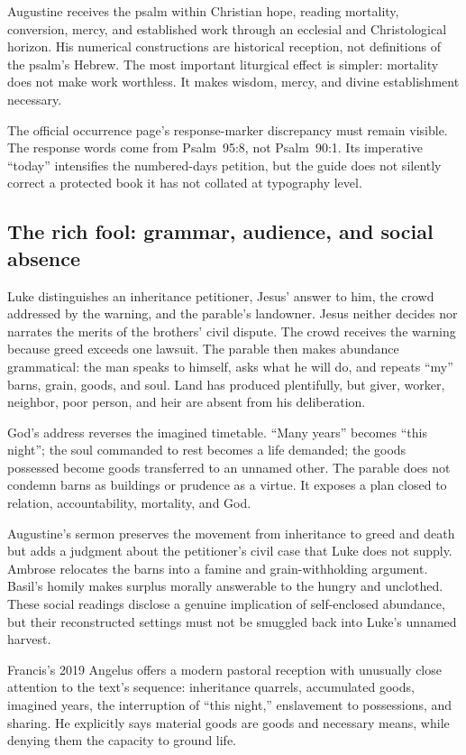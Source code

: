 Augustine receives the psalm within Christian hope, reading mortality,
conversion, mercy, and established work through an ecclesial and
Christological horizon. His numerical constructions are historical reception,
not definitions of the psalm's Hebrew. The most important liturgical effect is
simpler: mortality does not make work worthless. It makes wisdom, mercy, and
divine establishment necessary.

The official occurrence page's response-marker discrepancy must remain
visible. The response words come from Psalm~95:8, not Psalm~90:1. Its
imperative “today” intensifies the numbered-days petition, but the guide does
not silently correct a protected book it has not collated at typography level.

\subsection*{The rich fool: grammar, audience, and social absence}

Luke distinguishes an inheritance petitioner, Jesus' answer to him, the crowd
addressed by the warning, and the parable's landowner. Jesus neither decides
nor narrates the merits of the brothers' civil dispute. The crowd receives the
warning because greed exceeds one lawsuit. The parable then makes abundance
grammatical: the man speaks to himself, asks what he will do, and repeats
``my'' barns, grain, goods, and soul. Land has produced plentifully, but giver,
worker, neighbor, poor person, and heir are absent from his deliberation.

God's address reverses the imagined timetable. “Many years” becomes “this
night”; the soul commanded to rest becomes a life demanded; the goods
possessed become goods transferred to an unnamed other. The parable does not
condemn barns as buildings or prudence as a virtue. It exposes a plan closed
to relation, accountability, mortality, and God.

Augustine's sermon preserves the movement from inheritance to greed and death
but adds a judgment about the petitioner's civil case that Luke does not
supply. Ambrose relocates the barns into a famine and grain-withholding
argument. Basil's homily makes surplus morally answerable to the hungry and
unclothed. These social readings disclose a genuine implication of
self-enclosed abundance, but their reconstructed settings must not be smuggled
back into Luke's unnamed harvest.

Francis's 2019 Angelus offers a modern pastoral reception with unusually close
attention to the text's sequence: inheritance quarrels, accumulated goods,
imagined years, the interruption of “this night,” enslavement to possessions,
and sharing. He explicitly says material goods are goods and necessary means,
while denying them the capacity to ground life.

